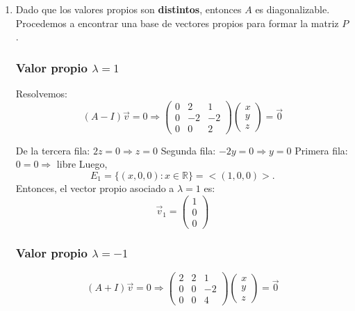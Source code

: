 \documentclass[a4paper]{article}
\begin{document}
\begin{enumerate}
\begin{enumerate}
    Entonces, el polinomio característico es:
    \[
    p(\lambda) = (1 - \lambda)(-1 - \lambda)(3 - \lambda)
    \]

    Los valores propios son las raíces del polinomio característico:
    \[
    \lambda_1 = 1, \quad \lambda_2 = -1, \quad \lambda_3 = 3
    \]

    \item Dado que los valores propios son \textbf{distintos}, entonces \( A \) es diagonalizable. Procedemos a encontrar una base de vectores propios para formar la matriz \( P \).

    \subsubsection*{Valor propio \( \lambda = 1 \)}

    Resolvemos:
    \[
    (A - I)\vec{v} = 0
    \Rightarrow
    \begin{pmatrix}
    0 & 2 & 1 \\
    0 & -2 & -2 \\
    0 & 0 & 2
    \end{pmatrix}
    \begin{pmatrix}
    x \\ y \\ z
    \end{pmatrix}
    = \vec{0}
    \]

    De la tercera fila: \( 2z = 0 \Rightarrow z = 0 \)  
    Segunda fila: \( -2y = 0 \Rightarrow y = 0 \)  
    Primera fila: \( 0 = 0 \Rightarrow \) libre
Luego,
\[E_{1}=\{(x,0,0)\colon x\in \mathbb{R}\}=<(1,0,0)>.\]
    Entonces, el vector propio asociado a \( \lambda = 1 \) es:
    \[
    \vec{v}_1 = \begin{pmatrix} 1 \\ 0 \\ 0 \end{pmatrix}
    \]

    \subsubsection*{Valor propio \( \lambda = -1 \)}

    \[
    (A + I)\vec{v} = 0
    \Rightarrow
    \begin{pmatrix}
    2 & 2 & 1 \\
    0 & 0 & -2 \\
    0 & 0 & 4
    \end{pmatrix}
    \begin{pmatrix}
    x \\ y \\ z
    \end{pmatrix}
    = \vec{0}
    \]


\end{enumerate}
\end{enumerate}
\end{document}
